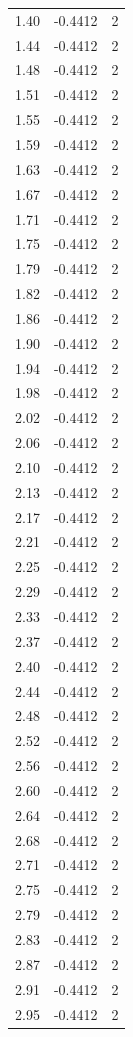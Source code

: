 \begin{longtable}{lrr}
  1.40 & -0.4412 & 2 \\
  1.44 & -0.4412 & 2 \\
  1.48 & -0.4412 & 2 \\
  1.51 & -0.4412 & 2 \\
  1.55 & -0.4412 & 2 \\
  1.59 & -0.4412 & 2 \\
  1.63 & -0.4412 & 2 \\
  1.67 & -0.4412 & 2 \\
  1.71 & -0.4412 & 2 \\
  1.75 & -0.4412 & 2 \\
  1.79 & -0.4412 & 2 \\
  1.82 & -0.4412 & 2 \\
  1.86 & -0.4412 & 2 \\
  1.90 & -0.4412 & 2 \\
  1.94 & -0.4412 & 2 \\
  1.98 & -0.4412 & 2 \\
  2.02 & -0.4412 & 2 \\
  2.06 & -0.4412 & 2 \\
  2.10 & -0.4412 & 2 \\
  2.13 & -0.4412 & 2 \\
  2.17 & -0.4412 & 2 \\
  2.21 & -0.4412 & 2 \\
  2.25 & -0.4412 & 2 \\
  2.29 & -0.4412 & 2 \\
  2.33 & -0.4412 & 2 \\
  2.37 & -0.4412 & 2 \\
  2.40 & -0.4412 & 2 \\
  2.44 & -0.4412 & 2 \\
  2.48 & -0.4412 & 2 \\
  2.52 & -0.4412 & 2 \\
  2.56 & -0.4412 & 2 \\
  2.60 & -0.4412 & 2 \\
  2.64 & -0.4412 & 2 \\
  2.68 & -0.4412 & 2 \\
  2.71 & -0.4412 & 2 \\
  2.75 & -0.4412 & 2 \\
  2.79 & -0.4412 & 2 \\
  2.83 & -0.4412 & 2 \\
  2.87 & -0.4412 & 2 \\
  2.91 & -0.4412 & 2 \\
  2.95 & -0.4412 & 2 \\

\end{longtable}

